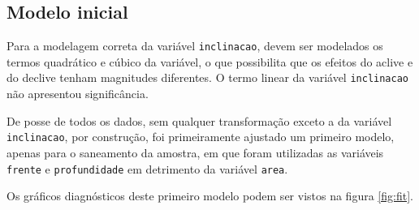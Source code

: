 \documentclass[a4paper, 12pt]{article}
\begin{document}
\hypertarget{modelo-inicial}{%
\subsection{Modelo inicial}\label{modelo-inicial}}

Para a modelagem correta da variável \texttt{inclinacao}, devem ser
modelados os termos quadrático e cúbico da variável, o que possibilita
que os efeitos do aclive e do declive tenham magnitudes diferentes. O
termo linear da variável \texttt{inclinacao} não apresentou
significância.

De posse de todos os dados, sem qualquer transformação exceto a da
variável \texttt{inclinacao}, por construção, foi primeiramente ajustado
um primeiro modelo, apenas para o saneamento da amostra, em que foram
utilizadas as variáveis \texttt{frente} e \texttt{profundidade} em
detrimento da variável \texttt{area}.

Os gráficos diagnósticos deste primeiro modelo podem ser vistos na
figura \ref{fig:fit}.
\end{document}
